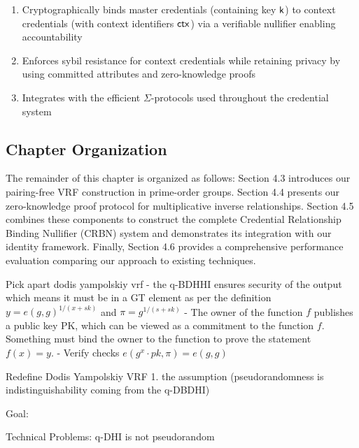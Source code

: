 \begin{enumerate}
    \item Cryptographically binds master credentials (containing key $\mathsf{k}$) to context credentials (with context identifiers $\mathsf{ctx}$) via a verifiable nullifier enabling accountability
    
    \item Enforces sybil resistance for context credentials while retaining privacy by using committed attributes and zero-knowledge proofs
    
    \item Integrates with the efficient $\Sigma$-protocols used throughout the credential system
\end{enumerate}

\subsection*{Chapter Organization}
The remainder of this chapter is organized as follows: Section 4.3 introduces our pairing-free VRF construction in prime-order groups. Section 4.4 presents our zero-knowledge proof protocol for multiplicative inverse relationships. Section 4.5 combines these components to construct the complete Credential Relationship Binding Nullifier (CRBN) system and demonstrates its integration with our identity framework. Finally, Section 4.6 provides a comprehensive performance evaluation comparing our approach to existing techniques.







Pick apart dodis yampolskiy vrf
- the q-BDHHI ensures security of the output which means it must be in a GT element as per the definition $y = e(g,g)^{1/(x+sk)}$ and $\pi = g^{1/(s+sk)}$
- The owner of the function $f$ publishes a public key PK, which can be viewed as a commitment to the function $f$. Something must bind the owner to the function to prove the statement $f(x) = y$. 
- Verify checks $e(g^x \cdot pk, \pi) = e(g,g)$










Redefine Dodis Yampolskiy VRF
1. the assumption (pseudorandomness is indistinguishability coming from the q-DBDHI)



Goal: 

Technical Problems: 
q-DHI is not pseudorandom


